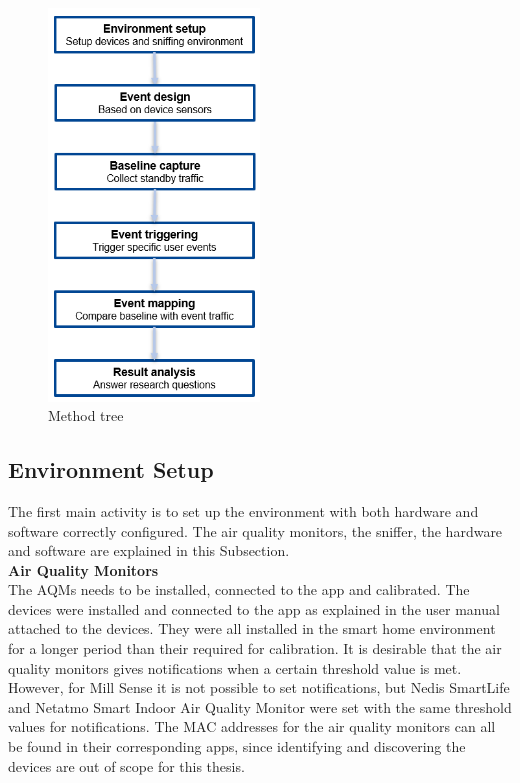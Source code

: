 \begin{figure} [H]
    \centering
    \includegraphics[width=0.5\textwidth]{figures/MethodTree.png}
    \caption{Method tree}
    \label{fig:MethodTree}
\end{figure}
\subsection{Environment Setup}
The first main activity is to set up the environment with both hardware and software correctly configured. The air quality monitors, the sniffer, the hardware and software are explained in this Subsection. 
\\
\textbf{Air Quality Monitors}\\
The \gls{AQM}s needs to be installed, connected to the app and calibrated. The devices were installed and connected to the app as explained in the user manual attached to the devices. They were all installed in the smart home environment for a longer period than their required for calibration. It is desirable that the air quality monitors gives notifications when a certain threshold value is met. However, for Mill Sense it is not possible to set notifications, but Nedis SmartLife and Netatmo Smart Indoor Air Quality Monitor were set with the same threshold values for notifications. The \gls{MAC} addresses for the air quality monitors can all be found in their corresponding apps, since identifying and discovering the devices are out of scope for this thesis. 

